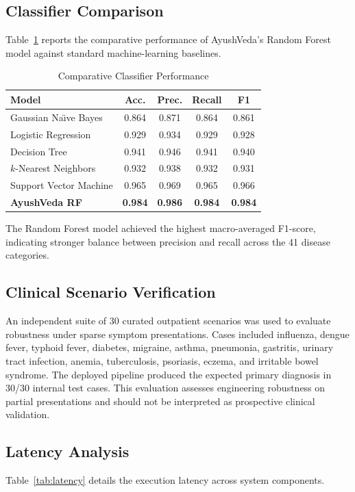 \documentclass[conference]{IEEEtran}
\begin{document}
\subsection{Classifier Comparison}
Table~\ref{tab:classifier_performance} reports the comparative performance of AyushVeda's Random Forest model against standard machine-learning baselines.

\begin{table}[htbp]
\caption{Comparative Classifier Performance}
\label{tab:classifier_performance}
\centering
\begin{tabular}{lcccc}
\toprule
\textbf{Model} & \textbf{Acc.} & \textbf{Prec.} & \textbf{Recall} & \textbf{F1} \\
\midrule
Gaussian Na{\"\i}ve Bayes \cite{singh2023disease} & 0.864 & 0.871 & 0.864 & 0.861 \\
Logistic Regression & 0.929 & 0.934 & 0.929 & 0.928 \\
Decision Tree & 0.941 & 0.946 & 0.941 & 0.940 \\
$k$-Nearest Neighbors & 0.932 & 0.938 & 0.932 & 0.931 \\
Support Vector Machine & 0.965 & 0.969 & 0.965 & 0.966 \\
\textbf{AyushVeda RF} & \textbf{0.984} & \textbf{0.986} & \textbf{0.984} & \textbf{0.984} \\
\bottomrule
\end{tabular}
\end{table}

The Random Forest model achieved the highest macro-averaged F1-score, indicating stronger balance between precision and recall across the 41 disease categories.

\subsection{Clinical Scenario Verification}
An independent suite of 30 curated outpatient scenarios was used to evaluate robustness under sparse symptom presentations. Cases included influenza, dengue fever, typhoid fever, diabetes, migraine, asthma, pneumonia, gastritis, urinary tract infection, anemia, tuberculosis, psoriasis, eczema, and irritable bowel syndrome. The deployed pipeline produced the expected primary diagnosis in 30/30 internal test cases. This evaluation assesses engineering robustness on partial presentations and should not be interpreted as prospective clinical validation.

\subsection{Latency Analysis}
Table~\ref{tab:latency} details the execution latency across system components.
\end{document}
